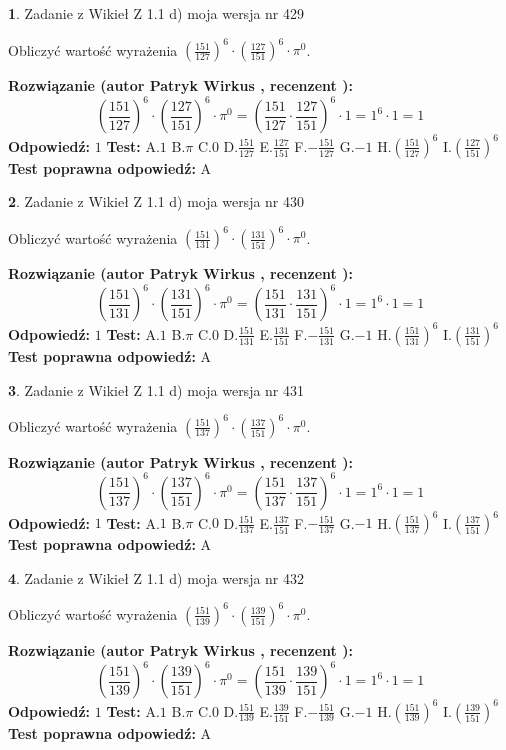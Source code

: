 \documentclass[12pt, a4paper]{article}
\theoremstyle{definition} %
\newtheorem{zad}{}
\newcommand{\zadStart}[1]{\begin{zad}#1\newline}
\newcommand{\zadStop}{\end{zad}}
\newcommand{\rozwStart}[2]{\noindent \textbf{Rozwiązanie (autor #1 , recenzent #2): }\newline}
\newcommand{\rozwStop}{\newline}
\newcommand{\odpStart}{\noindent \textbf{Odpowiedź:}\newline}
\newcommand{\odpStop}{\newline}
\newcommand{\testStart}{\noindent \textbf{Test:}\newline}
\newcommand{\testStop}{\newline}
\newcommand{\kluczStart}{\noindent \textbf{Test poprawna odpowiedź:}\newline}
\newcommand{\kluczStop}{\newline}
\begin{document}
\zadStart{Zadanie z Wikieł Z 1.1 d) moja wersja nr 429}

Obliczyć wartość wyrażenia $(\frac{151}{127})^{6} \cdot (\frac{127}{151})^{6} \cdot \pi^{0}$.
\zadStop
\rozwStart{Patryk Wirkus}{}
$$(\frac{151}{127})^{6} \cdot (\frac{127}{151})^{6} \cdot \pi^{0} = (\frac{151}{127} \cdot \frac{127}{151})^{6} \cdot 1 = 1^{6} \cdot 1 = 1$$
\rozwStop
\odpStart
$1$
\odpStop
\testStart
A.$1$ B.$\pi$ C.$0$ D.$\frac{151}{127}$ E.$\frac{127}{151}$
F.$-\frac{151}{127}$ G.$-1$
H.$(\frac{151}{127})^{6}$
I.$(\frac{127}{151})^{6}$
\testStop
\kluczStart
A
\kluczStop



\zadStart{Zadanie z Wikieł Z 1.1 d) moja wersja nr 430}

Obliczyć wartość wyrażenia $(\frac{151}{131})^{6} \cdot (\frac{131}{151})^{6} \cdot \pi^{0}$.
\zadStop
\rozwStart{Patryk Wirkus}{}
$$(\frac{151}{131})^{6} \cdot (\frac{131}{151})^{6} \cdot \pi^{0} = (\frac{151}{131} \cdot \frac{131}{151})^{6} \cdot 1 = 1^{6} \cdot 1 = 1$$
\rozwStop
\odpStart
$1$
\odpStop
\testStart
A.$1$ B.$\pi$ C.$0$ D.$\frac{151}{131}$ E.$\frac{131}{151}$
F.$-\frac{151}{131}$ G.$-1$
H.$(\frac{151}{131})^{6}$
I.$(\frac{131}{151})^{6}$
\testStop
\kluczStart
A
\kluczStop



\zadStart{Zadanie z Wikieł Z 1.1 d) moja wersja nr 431}

Obliczyć wartość wyrażenia $(\frac{151}{137})^{6} \cdot (\frac{137}{151})^{6} \cdot \pi^{0}$.
\zadStop
\rozwStart{Patryk Wirkus}{}
$$(\frac{151}{137})^{6} \cdot (\frac{137}{151})^{6} \cdot \pi^{0} = (\frac{151}{137} \cdot \frac{137}{151})^{6} \cdot 1 = 1^{6} \cdot 1 = 1$$
\rozwStop
\odpStart
$1$
\odpStop
\testStart
A.$1$ B.$\pi$ C.$0$ D.$\frac{151}{137}$ E.$\frac{137}{151}$
F.$-\frac{151}{137}$ G.$-1$
H.$(\frac{151}{137})^{6}$
I.$(\frac{137}{151})^{6}$
\testStop
\kluczStart
A
\kluczStop



\zadStart{Zadanie z Wikieł Z 1.1 d) moja wersja nr 432}

Obliczyć wartość wyrażenia $(\frac{151}{139})^{6} \cdot (\frac{139}{151})^{6} \cdot \pi^{0}$.
\zadStop
\rozwStart{Patryk Wirkus}{}
$$(\frac{151}{139})^{6} \cdot (\frac{139}{151})^{6} \cdot \pi^{0} = (\frac{151}{139} \cdot \frac{139}{151})^{6} \cdot 1 = 1^{6} \cdot 1 = 1$$
\rozwStop
\odpStart
$1$
\odpStop
\testStart
A.$1$ B.$\pi$ C.$0$ D.$\frac{151}{139}$ E.$\frac{139}{151}$
F.$-\frac{151}{139}$ G.$-1$
H.$(\frac{151}{139})^{6}$
I.$(\frac{139}{151})^{6}$
\testStop
\kluczStart
A
\kluczStop
\end{document}
